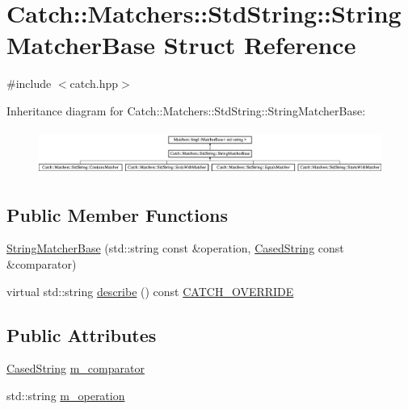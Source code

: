 \hypertarget{structCatch_1_1Matchers_1_1StdString_1_1StringMatcherBase}{\section{Catch\-:\-:Matchers\-:\-:Std\-String\-:\-:String\-Matcher\-Base Struct Reference}
\label{structCatch_1_1Matchers_1_1StdString_1_1StringMatcherBase}
}


{\ttfamily \#include $<$catch.\-hpp$>$}

Inheritance diagram for Catch\-:\-:Matchers\-:\-:Std\-String\-:\-:String\-Matcher\-Base\-:\begin{figure}[H]
\begin{center}
\leavevmode
\includegraphics[height=1.484099cm]{structCatch_1_1Matchers_1_1StdString_1_1StringMatcherBase}
\end{center}
\end{figure}
\subsection*{Public Member Functions}
\begin{DoxyCompactItemize}
\item 
\hyperlink{structCatch_1_1Matchers_1_1StdString_1_1StringMatcherBase_a3a9b66bae298ae27058478529b4bb39d}{String\-Matcher\-Base} (std\-::string const \&operation, \hyperlink{structCatch_1_1Matchers_1_1StdString_1_1CasedString}{Cased\-String} const \&comparator)
\item 
virtual std\-::string \hyperlink{structCatch_1_1Matchers_1_1StdString_1_1StringMatcherBase_a9d15cfb882efbea778b2ed29e7f48f37}{describe} () const \hyperlink{catch_8hpp_a8ecdce4d3f57835f707915ae831eb847}{C\-A\-T\-C\-H\-\_\-\-O\-V\-E\-R\-R\-I\-D\-E}
\end{DoxyCompactItemize}
\subsection*{Public Attributes}
\begin{DoxyCompactItemize}
\item 
\hyperlink{structCatch_1_1Matchers_1_1StdString_1_1CasedString}{Cased\-String} \hyperlink{structCatch_1_1Matchers_1_1StdString_1_1StringMatcherBase_a17c9f0fe40587070ffe998c193742831}{m\-\_\-comparator}
\item 
std\-::string \hyperlink{structCatch_1_1Matchers_1_1StdString_1_1StringMatcherBase_a7a25c4b7d863e9a1c406d81efd0f83ca}{m\-\_\-operation}
\end{DoxyCompactItemize}


